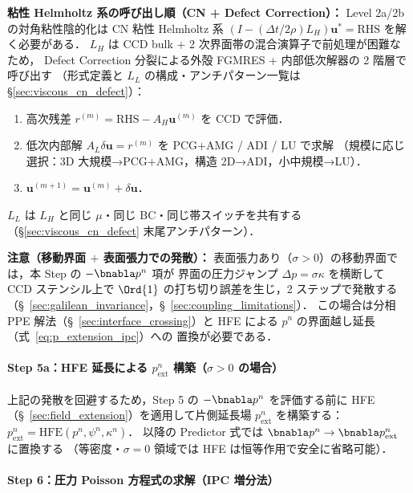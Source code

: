 \begin{tcolorbox}[algbox, title={1 タイムステップ $t^n \to t^{n+1}$ の完全アルゴリズム}]
\medskip
\noindent\textbf{粘性 Helmholtz 系の呼び出し順（CN + Defect Correction）：}
Level 2a/2b の対角粘性陰的化は CN 粘性 Helmholtz 系
$(I-(\Delta t/2\rho)L_H)\mathbf{u}^*=\text{RHS}$ を解く必要がある．
$L_H$ は CCD bulk + 2 次界面帯の混合演算子で前処理が困難なため，
Defect Correction 分裂による外殻 FGMRES + 内部低次解器の 2 階層で呼び出す
（形式定義と $L_L$ の構成・アンチパターン一覧は §\ref{sec:viscous_cn_defect}）：
\begin{enumerate}[noitemsep,leftmargin=2em]
  \item 高次残差 $r^{(m)} = \text{RHS} - A_H\mathbf{u}^{(m)}$ を CCD で評価．
  \item 低次内部解 $A_L\delta\mathbf{u} = r^{(m)}$ を PCG+AMG / ADI / LU で求解
        （規模に応じ選択：3D 大規模→PCG+AMG，構造 2D→ADI，小中規模→LU）．
  \item $\mathbf{u}^{(m+1)} = \mathbf{u}^{(m)} + \delta\mathbf{u}$．
\end{enumerate}
$L_L$ は $L_H$ と同じ $\mu$・同じ BC・同じ帯スイッチを共有する
（§\ref{sec:viscous_cn_defect} 末尾アンチパターン）．

\noindent\textbf{注意（移動界面 $+$ 表面張力での発散）：}
表面張力あり（$\sigma > 0$）の移動界面では，本 Step の $-\bnabla p^n$ 項が
界面の圧力ジャンプ $\Delta p = \sigma\kappa$ を横断して CCD ステンシル上で
$\Ord{1}$ の打ち切り誤差を生じ，2 ステップで発散する
（§~\ref{sec:galilean_invariance}，§~\ref{sec:coupling_limitations}）．
この場合は分相 PPE 解法（§~\ref{sec:interface_crossing}）と
HFE による $p^n$ の界面越し延長（式~\eqref{eq:p_extension_ipc}）への
置換が必要である．

\paragraph{Step 5a：HFE 延長による $p^n_{\mathrm{ext}}$ 構築（$\sigma > 0$ の場合）}
上記の発散を回避するため，Step 5 の $-\bnabla p^n$ を評価する前に
HFE（§~\ref{sec:field_extension}）を適用して片側延長場 $p^n_{\mathrm{ext}}$ を構築する：
$p^n_{\mathrm{ext}} = \text{HFE}(p^n,\psi^n,\kappa^n)$．
以降の Predictor 式では $\bnabla p^n \to \bnabla p^n_{\mathrm{ext}}$ に置換する
（等密度・$\sigma=0$ 領域では HFE は恒等作用で安全に省略可能）．

\paragraph{Step 6：圧力 Poisson 方程式の求解（IPC 増分法）}


\end{tcolorbox}

